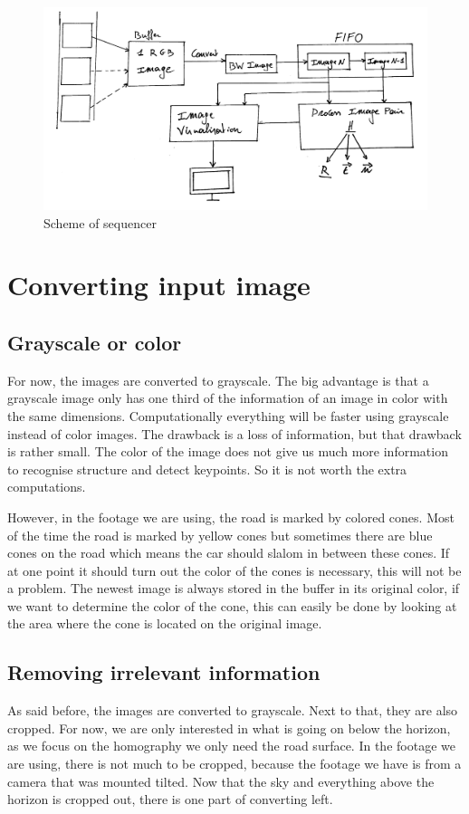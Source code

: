 \begin{figure}
    \centering
    \includegraphics[width=1\textwidth]{figures/Block_diagram_sequencer.jpg}
    \caption{Scheme of sequencer}
    \label{fig:scheme}
\end{figure}

\section{Converting input image}
\subsection{Grayscale or color}
For now, the images are converted to grayscale. The big advantage is that a grayscale image only has one third of the information of an image in color with the same dimensions. Computationally everything will be faster using grayscale instead of color images. The drawback is a loss of information, but that drawback is rather small. The color of the image does not give us much more information to recognise structure and detect keypoints. So it is not worth the extra computations.\bigskip

However, in the footage we are using, the road is marked by colored cones. Most of the time the road is marked by yellow cones but sometimes there are blue cones on the road which means the car should slalom in between these cones. If at one point it should turn out the color of the cones is necessary, this will not be a problem. The newest image is always stored in the buffer in its original color, if we want to determine the color of the cone, this can easily be done by looking at the area where the cone is located on the original image.

\subsection{Removing irrelevant information}\label{ssec:irrelevant}
As said before, the images are converted to grayscale. Next to that, they are also cropped. For now, we are only interested in what is going on below the horizon, as we focus on the homography we only need the road surface. In the footage we are using, there is not much to be cropped, because the footage we have is from a camera that was mounted tilted. Now that the sky and everything above the horizon is cropped out, there is one part of converting left.

